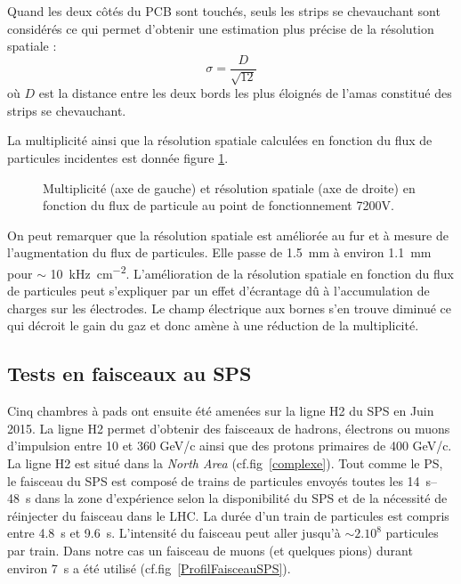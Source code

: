Quand les deux côtés du PCB sont touchés, seuls les strips se chevauchant sont considérés ce qui permet d'obtenir une estimation plus précise de la résolution spatiale :
\begin{equation}
\sigma=\frac{D}{\sqrt{12}}
\end{equation} 
où $D$ est la distance entre les deux bords les plus éloignés de l'amas constitué des strips se chevauchant.

La multiplicité ainsi que la résolution spatiale calculées en fonction du flux de particules incidentes est donnée figure \ref{ResoSpatialPS}. 

\begin{figure}[!ht]
	\centering
	\scalebox{1.4}{}
	\caption{Multiplicité (axe de gauche) et résolution spatiale (axe de droite) en fonction du flux de particule au point de fonctionnement 7200V.}
	\label{ResoSpatialPS}
\end{figure}

On peut remarquer que la résolution spatiale est améliorée au fur et à mesure de l'augmentation du flux de particules. Elle passe de \SI{1.5}{\milli\meter} à environ \SI{1.1}{\milli\meter} pour $\sim$ \SI{10}{\kilo\hertz\per\square\centi\meter}. L'amélioration de la résolution spatiale en fonction du flux de particules peut s'expliquer par un effet d'écrantage dû à l'accumulation de charges sur les électrodes. Le champ électrique aux bornes s'en trouve diminué ce qui décroit le gain du gaz et donc amène à une réduction de la multiplicité.

\subsection{Tests en faisceaux au SPS} 
Cinq chambres à pads ont ensuite été amenées sur la ligne H2 \cite{H2line} du SPS en Juin 2015. La ligne H2 permet d'obtenir des faisceaux de hadrons, électrons ou muons d'impulsion entre 10 et 360 GeV/c ainsi que des protons primaires de 400 GeV/c. La ligne H2 est situé dans la \textit{North Area} (cf.fig~\ref{complexe}). Tout comme le PS, le faisceau du SPS est composé de trains de particules envoyés toutes les \SIrange{14}{48}{\second} dans la zone d’expérience selon la disponibilité du SPS et de la nécessité de réinjecter du faisceau dans le LHC. La durée d’un train de particules est compris entre \SI{4.8}{\second} et \SI{9.6}{\second}. L'intensité du faisceau peut aller jusqu'à $\sim 2.10^{8}$ particules par train. Dans notre cas un faisceau de muons (et quelques pions) durant environ \SI{7}{\second} a été utilisé (cf.fig~\ref{ProfilFaisceauSPS}).

